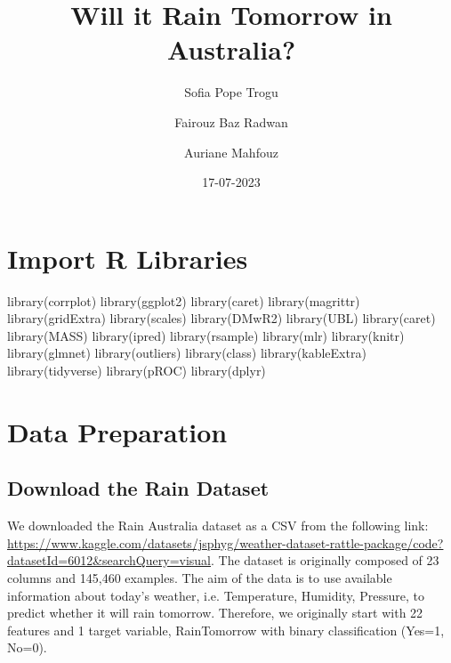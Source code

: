 \documentclass[
]{article}
\title{Will it Rain Tomorrow in Australia?}
\author{Sofia Pope Trogu \and Fairouz Baz Radwan \and Auriane Mahfouz}
\date{17-07-2023}
\newenvironment{Shaded}{\begin{snugshade}}{\end{snugshade}}
\newcommand{\FunctionTok}[1]{\textcolor[rgb]{0.00,0.00,0.00}{#1}}
\newcommand{\NormalTok}[1]{#1}
\begin{document}
\maketitle

{
\setcounter{tocdepth}{2}
\tableofcontents
}
\hypertarget{import-r-libraries}{%
\section{Import R Libraries}\label{import-r-libraries}}

\begin{Shaded}
\begin{Highlighting}[]
\FunctionTok{library}\NormalTok{(corrplot)}
\FunctionTok{library}\NormalTok{(ggplot2)}
\FunctionTok{library}\NormalTok{(caret)}
\FunctionTok{library}\NormalTok{(magrittr)}
\FunctionTok{library}\NormalTok{(gridExtra)  }
\FunctionTok{library}\NormalTok{(scales)}
\FunctionTok{library}\NormalTok{(DMwR2)}
\FunctionTok{library}\NormalTok{(UBL)}
\FunctionTok{library}\NormalTok{(caret)}
\FunctionTok{library}\NormalTok{(MASS)}
\FunctionTok{library}\NormalTok{(ipred)}
\FunctionTok{library}\NormalTok{(rsample)}
\FunctionTok{library}\NormalTok{(mlr)}
\FunctionTok{library}\NormalTok{(knitr)}
\FunctionTok{library}\NormalTok{(glmnet)}
\FunctionTok{library}\NormalTok{(outliers)}
\FunctionTok{library}\NormalTok{(class)}
\FunctionTok{library}\NormalTok{(kableExtra)}
\FunctionTok{library}\NormalTok{(tidyverse)}
\FunctionTok{library}\NormalTok{(pROC)}
\FunctionTok{library}\NormalTok{(dplyr)}
\end{Highlighting}
\end{Shaded}

\hypertarget{data-preparation}{%
\section{Data Preparation}\label{data-preparation}}

\hypertarget{download-the-rain-dataset}{%
\subsection{Download the Rain Dataset}\label{download-the-rain-dataset}}

We downloaded the Rain Australia dataset as a CSV from the following
link:
\url{https://www.kaggle.com/datasets/jsphyg/weather-dataset-rattle-package/code?datasetId=6012\&searchQuery=visual}.
The dataset is originally composed of 23 columns and 145,460 examples.
The aim of the data is to use available information about today's
weather, i.e. Temperature, Humidity, Pressure, to predict whether it
will rain tomorrow. Therefore, we originally start with 22 features and
1 target variable, RainTomorrow with binary classification (Yes=1,
No=0).
\end{document}

